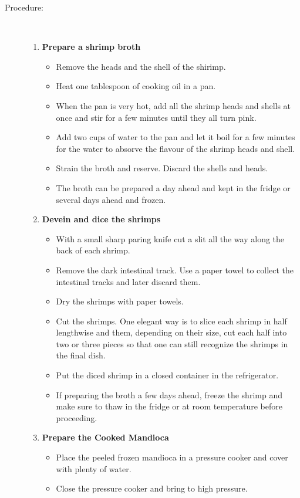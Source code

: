 \documentclass[11pt,letterpaper]{article}
\begin{document}
\begin{description}
\item[Procedure:]\ \\
	\begin{enumerate}
	\item {\bf Prepare a shrimp broth}
	\begin{itemize}
	\item Remove the heads and the shell of the shirimp.
	\item Heat one tablespoon of cooking oil in a pan.
	\item When the pan is very hot, add all the shrimp heads and shells at once and stir for a few minutes until they all turn pink.
	\item Add two cups of water to the pan and let it boil for a few minutes for the water to absorve the flavour of the shrimp heads and shell.
	\item Strain the broth and reserve. Discard the shells and heads.
	\item The broth can be prepared a day ahead and kept in the fridge or several days ahead and frozen.
	\end{itemize}
	\item {\bf Devein  and dice the shrimps}
	\begin{itemize}
	\item With a small sharp paring knife cut a slit all the way along the back of each shrimp.
	\item Remove the dark intestinal track. Use a paper towel to collect the intestinal tracks and later discard them.
	\item Dry the shrimps with paper towels.
	\item Cut the shrimps. One elegant way is to slice each shrimp in half lengthwise and them, depending on their size, cut each half into two or three pieces so that one can still recognize the shrimps in the final dish.
	\item Put the diced shrimp in a closed container in the refrigerator.
	\item If preparing the broth a few days ahead, freeze the shrimp and make sure to thaw in the fridge or at room temperature before proceeding.
	\end{itemize}
	\item {\bf Prepare the Cooked Mandioca}
	\begin{itemize}
	\item Place the peeled frozen mandioca in a pressure cooker and cover with plenty of water.
	\item Close the pressure cooker and bring to high pressure.

\end{itemize}
\end{enumerate}
\end{description}
\end{document}
